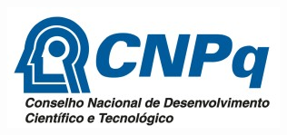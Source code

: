 \documentclass[a0paper,portrait]{baposter}
\begin{document}
\begin{poster}
{\begin{minipage}{0.8\textwidth}
\nocite{*}

{\footnotesize
} %
\end{minipage}
\hfill
\begin{minipage}{0.2\textwidth}
\begin{center}
\includegraphics[scale=0.35]{cnpq.jpg}
\end{center}
\end{minipage}
}

\end{poster}
\end{document}
